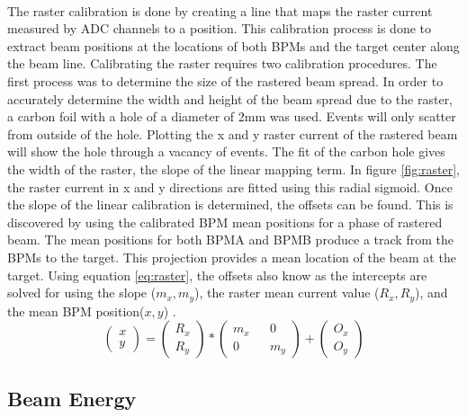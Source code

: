	 \paragraph{}
	 The raster calibration is done by creating a line that maps the raster current measured by ADC channels to a position. This calibration process is done to extract beam positions at the locations of both BPMs and the target center along the beam line. Calibrating the raster requires two calibration procedures. The first process was to determine the size of the rastered beam spread. In order to accurately determine the width and height of the beam spread due to the raster, a carbon foil with a hole of a diameter of 2mm was used. Events will only scatter from outside of the hole. Plotting the x and y raster current of the rastered beam will show the hole through a vacancy of events. The fit of the carbon hole gives the width of the raster, the slope of the linear mapping term. In figure \ref{fig:raster}, the raster current in x and y directions are fitted using this radial sigmoid. Once the slope of the linear calibration is determined, the offsets can be found. This is discovered by using the calibrated BPM mean positions for a phase of rastered beam. The mean positions for both BPMA and BPMB produce a track from the BPMs to the target. This projection provides a mean location of the beam at the target.  Using equation \ref{eq:raster}, the offsets also know as the intercepts are solved for using the slope ($m_x,m_y$), the raster mean current value ($R_x,R_y$), and the mean BPM position($x,y$) \cite{Trast}.
	 \begin{equation}
	 	\begin{pmatrix}
		 	x\\
	 		y
	 	\end{pmatrix}
	 	=
	 	\begin{pmatrix}
	 		R_x\\
		 	R_y
	 	\end{pmatrix}
	 	*
	 	\begin{pmatrix}
			m_x && 0 \\
			0  && m_y
	 	\end{pmatrix}
	 	+
	 	\begin{pmatrix}
		 	O_x\\
	 		O_y
	 	\end{pmatrix}
	 	\label{eq:raster}
	 \end{equation}

 
	 \subsection{Beam Energy}
